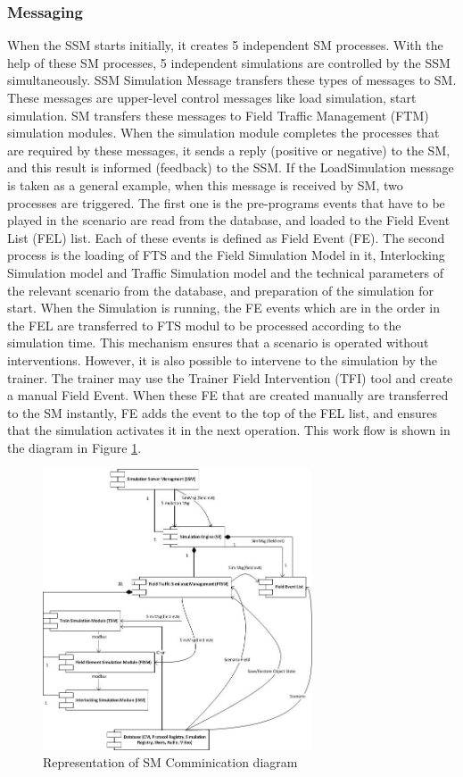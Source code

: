 \documentclass[conference]{IEEEtran}
\begin{document}
\subsubsection{Messaging}

When the SSM starts initially, it creates 5 independent SM processes. With the help of these SM processes, 5 independent simulations are controlled by the SSM simultaneously. SSM Simulation Message transfers these types of messages to SM. These messages are upper-level control messages like load simulation, start simulation. SM transfers these messages to Field Traffic Management (FTM) simulation modules. When the simulation module completes the processes that are required by these messages, it sends a reply (positive or negative) to the SM, and this result is informed (feedback) to the SSM. If the LoadSimulation message is taken as a general example, when this message is received by SM, two processes are triggered. The first one is the pre-programs events that have to be played in the scenario are read from the database, and loaded to the Field Event List (FEL) list. Each of these events is defined as Field Event (FE). The second process is the loading of FTS and the Field Simulation Model in it, Interlocking Simulation model and Traffic Simulation model and the technical parameters of the relevant scenario from the database, and preparation of the simulation for start. When the Simulation is running, the FE events which are in the order in the FEL are transferred to FTS modul to be processed according to the simulation time. This mechanism ensures that a scenario is operated without interventions. However, it is also possible to intervene to the simulation by the trainer. The trainer may use the Trainer Field Intervention (TFI) tool and create a manual Field Event. When these FE that are created manually are transferred to the SM instantly, FE adds the event to the top of the FEL list, and ensures that the simulation activates it in the next operation. This work flow is shown in the diagram in Figure  \ref{fig:smCommunicationDiagram}.

\begin{figure}[h!]
  \centering
  \includegraphics[width=8cm]{smCommunicationDiagram.jpg}
  \caption{Representation of SM Comminication diagram}\label{fig:smCommunicationDiagram}
\end{figure}
\end{document}
